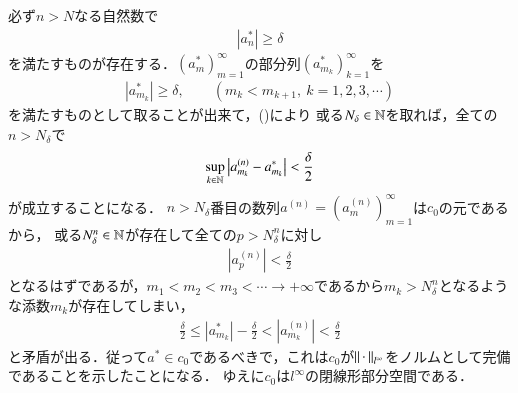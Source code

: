 \begin{prf}
\begin{description}
		必ず$n > N$なる自然数で
		\begin{align}
			|a_n^*| \geq \delta
		\end{align}
		を満たすものが存在する．$(a_m^*)_{m=1}^{\infty}$の部分列$(a_{m_k}^*)_{k=1}^{\infty}$を
		\begin{align}
			|a_{m_k}^*| \geq \delta, \qquad (m_k < m_{k+1},\ k= 1,2,3,\cdots)
		\end{align}
		を満たすものとして取ることが出来て，()により
		或る$N_\delta \in \mathbb{N}$を取れば，全ての$n > N_\delta$で
		\begin{align}
			\operatorname*{sup}_{k \in \mathbb{N}} \left|a_{m_k}^{(n)} - a_{m_k}^{*}\right| < \frac{\delta}{2}
		\end{align}
		が成立することになる．
		$n > N_\delta$番目の数列$a^{(n)}=\left(a_m^{(n)}\right)_{m=1}^{\infty}$は$c_0$の元であるから，
		或る$N_\delta^n \in \mathbb{N}$が存在して全ての$p > N_\delta^n$に対し
		\begin{align}
			\left|a_p^{(n)}\right| < \frac{\delta}{2}
		\end{align}
		となるはずであるが，$m_1 < m_2 < m_3 < \cdots \rightarrow +\infty$であるから$m_k > N_\delta^n$となるような添数$m_k$が存在してしまい，
		\begin{align}
			\frac{\delta}{2} \leq \left|a_{m_k}^*\right| - \frac{\delta}{2} < \left|a_{m_k}^{(n)}\right| < \frac{\delta}{2}
		\end{align}
		と矛盾が出る．従って$a^* \in c_0$であるべきで，これは$c_0$が$\left\|\, \cdot\, \right\|_{l^{\infty}}$をノルムとして完備であることを示したことになる．
		ゆえに$c_0$は$l^{\infty}$の閉線形部分空間である．
		

\end{description}
\end{prf}
